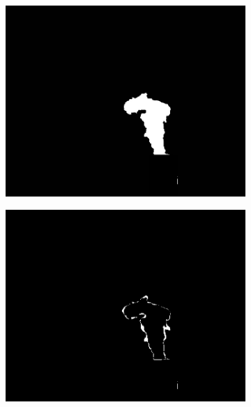 \documentclass[14pt, a4paper]{extreport}
\begin{document}
\begin{figure}[h!]
\begin{subfigure}{.32\textwidth}
			\includegraphics[width = \textwidth]{image/chapter_3/examples/mask/185}
		\end{subfigure}
		\begin{subfigure}{.32\textwidth}
			\centering
			\includegraphics[width = \textwidth]{image/chapter_3/examples/mask_dif/185}
		\end{subfigure}
		\begin{subfigure}{.32\textwidth}
			\centering

\end{subfigure}
\end{figure}
\end{document}
